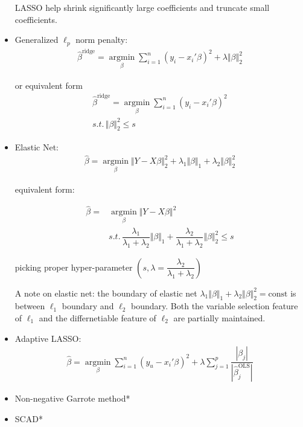 \begin{itemize}[topsep=2pt,itemsep=0pt]
        LASSO help shrink significantly large coefficients and truncate small coefficients.
        
        \item Generalized $ \ell_p $ norm penalty: 
        \begin{align}
            \hat{\beta }^\mathrm{ridge}=\mathop{\arg\min}\limits_{\beta } \sum_{i=1}^n(y_i-x_i'\beta )^2+ \lambda \Vert \beta  \Vert _2^2 
        \end{align}

        or equivalent form 
        \begin{align}
            \hat{\beta }^\mathrm{ridge}=\mathop{\arg\min}\limits_{\beta } \sum_{i=1}^n(y_i-x_i'\beta )^2 \\
            s.t.\,\Vert \beta  \Vert _2^2\leq s
        \end{align}
        
        \item Elastic Net: 
        \begin{align}
            \hat{\beta }=\mathop{\arg\min}\limits_{\beta }\Vert Y-X\beta  \Vert _2^2+\lambda _1\Vert \beta  \Vert _1+\lambda _2\Vert \beta  \Vert _2^2  
        \end{align}
        
        equivalent form:       
        
        \begin{align}
            \hat{\beta }=&\mathop{\arg\min}\limits_{\beta}\Vert Y-X\beta  \Vert ^2\\
            &s.t. \, \dfrac{\lambda _1}{\lambda _1+\lambda _2}\Vert \beta  \Vert_1+\dfrac{\lambda _2}{\lambda _1+\lambda _2}\Vert \beta  \Vert _2^2\leq s 
        \end{align}
        
        picking proper hyper-parameter $ (s,\lambda =\dfrac{\lambda _2}{\lambda _1+\lambda _2}) $

        A note on elastic net: the boundary of elastic net $ \lambda _1\Vert \beta  \Vert _1+\lambda _2\Vert \beta  \Vert _2^2  =\mathrm{const} $ is between $ \ell_1 $ boundary and $ \ell_2 $ boundary. Both the variable selection feature of $ \ell_1 $ and the differnetiable feature of $ \ell_2 $ are partially maintained.
        
        \item Adaptive LASSO:
        \begin{align}
            \hat{\beta}=\mathop{\arg\min}\limits_{\beta } \sum_{i=1}^n\left(y_u-x_i'\beta \right) ^2+\lambda \sum_{j=1}^p\dfrac{|\beta _j|}{|\hat{\beta }_j^{\mathrm{OLS}} |}
        \end{align}
        \item Non-negative Garrote method*
        \item SCAD*
    \end{itemize}
    
